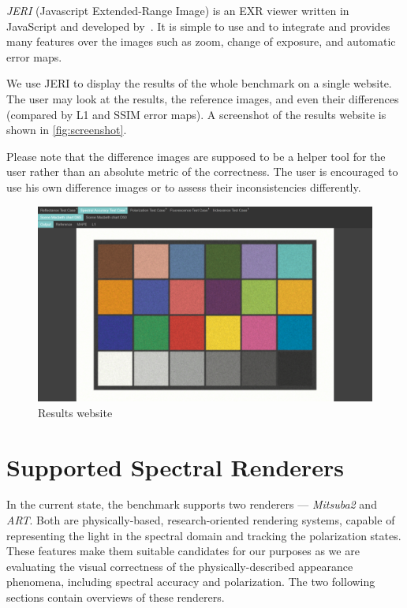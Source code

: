 \emph{JERI} (Javascript Extended-Range Image) is an EXR viewer written in \\JavaScript and developed by~\citet{jeriWeb}. It is simple to use and to integrate and provides many features over the images such as zoom, change of exposure, and automatic error maps.

We use JERI to display the results of the whole benchmark on a single website. The user may look at the results, the reference images, and even their differences (compared by L1 and SSIM error maps). A screenshot of the results website is shown in \autoref{fig:screenshot}.

Please note that the difference images are supposed to be a helper tool for the user rather than an absolute metric of the correctness. The user is encouraged to use his own difference images or to assess their inconsistencies differently.

\begin{figure}
	\centering
	\includegraphics[width=\linewidth]{img/screenshot.png}
	\caption{Results website}
	\label{fig:screenshot}
\end{figure}

\section{Supported Spectral Renderers}

In the current state, the benchmark supports two renderers --- \emph{Mitsuba2} and \emph{ART}. Both are physically-based, research-oriented rendering systems, capable of representing the light in the spectral domain and tracking the polarization states. These features make them suitable candidates for our purposes as we are evaluating the visual correctness of the physically-described appearance phenomena, including spectral accuracy and polarization. The two following sections contain overviews of these renderers.

